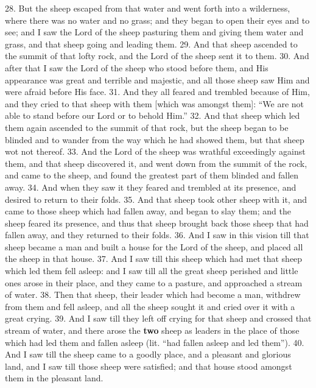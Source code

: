 
28. But the sheep escaped from that water and
went forth into a wilderness, where there was no
water and no grass; and they began to open their eyes
and to see; and I saw the Lord of the sheep pasturing
them and giving them water and grass, and that sheep
going and leading them. 29. And that sheep ascended
to the summit of that lofty rock, and the Lord
of the sheep sent it to them. 30. And after that I
saw the Lord of the sheep who stood before them, and
His appearance was great and terrible and majestic,
and all those sheep saw Him and were afraid before
His face. 31. And they all feared and trembled
because of Him, and they cried to that sheep with
them [which was amongst them]: “We are not able
to stand before our Lord or to behold Him.” 32. And
that sheep which led them again ascended to the
summit of that rock, but the sheep began to be
blinded and to wander from the way which he had
showed them, but that sheep wot not thereof. 33. And
the Lord of the sheep was wrathful exceedingly
against them, and that sheep discovered it, and went
down from the summit of the rock, and came to the
sheep, and found the greatest part of them blinded
and fallen away. 34. And when they saw it they
feared and trembled at its presence, and desired to
return to their folds. 35. And that sheep took other
sheep with it, and came to those sheep which had
fallen away, and began to slay them; and the sheep
feared its presence, and thus that sheep brought back
those sheep that had fallen away, and they returned
to their folds. 36. And I saw in this vision till that
sheep became a man and built a house for the Lord
of the sheep, and placed all the sheep in that house.
37. And I saw till this sheep which had met that sheep
which led them fell asleep: and I saw till all the great
sheep perished and little ones arose in their place,
and they came to a pasture, and approached a stream
of water. 38. Then that sheep, their leader which
had become a man, withdrew from them and fell
asleep, and all the sheep sought it and cried over it
with a great crying. 39. And I saw till they left
off crying for that sheep and crossed that stream of
water, and there arose the \textbf{two} sheep as leaders in the
place of those which had led them and fallen asleep
(lit. “had fallen asleep and led them”). 40. And
I saw till the sheep came to a goodly place, and a
pleasant and glorious land, and I saw till those sheep
were satisfied; and that house stood amongst them
in the pleasant land.

